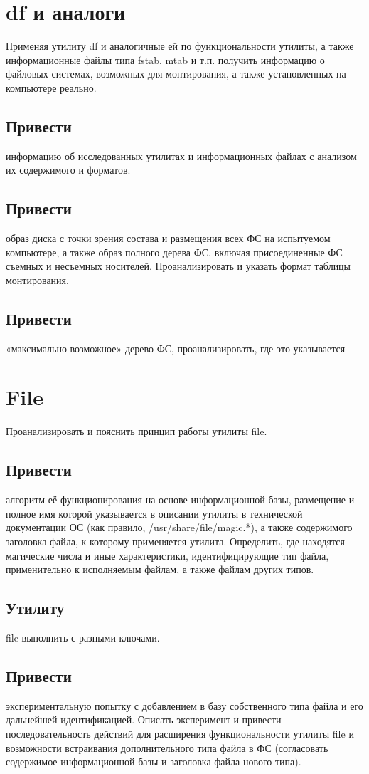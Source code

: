 \documentclass[a4paper]{article}
\begin{document}
\section{ df и аналоги} Применяя утилиту df и аналогичные ей по функциональности утилиты, а также информационные файлы типа fstab, mtab и т.п. получить информацию о файловых системах, возможных для монтирования, а также установленных на компьютере реально. 
\subsection{ Привести} информацию об исследованных утилитах и информационных файлах с анализом их содержимого и форматов. 
\subsection{ Привести} образ диска с точки зрения состава и размещения всех ФС на испытуемом компьютере, а также образ полного дерева ФС, включая присоединенные ФС съемных и несъемных носителей. Проанализировать и указать формат таблицы монтирования.
\subsection{ Привести} «максимально возможное» дерево ФС, проанализировать, где это указывается

\section{ File} Проанализировать и пояснить принцип работы утилиты file.  
\subsection{ Привести} алгоритм её функционирования на основе информационной базы, размещение и полное имя которой указывается в описании утилиты в технической документации ОС (как правило, /usr/share/file/magic.*), а также содержимого заголовка файла, к которому применяется утилита. Определить, где находятся магические числа и иные характеристики, идентифицирующие тип файла, применительно к исполняемым файлам, а также файлам других типов. 
\subsection{ Утилиту} file выполнить с разными ключами. 
\subsection{ Привести} экспериментальную попытку с добавлением в базу собственного типа файла и его дальнейшей идентификацией. Описать эксперимент и привести последовательность действий для расширения функциональности утилиты file и возможности встраивания дополнительного типа файла в ФС (согласовать содержимое информационной базы и заголовка файла нового типа).
\end{document}
